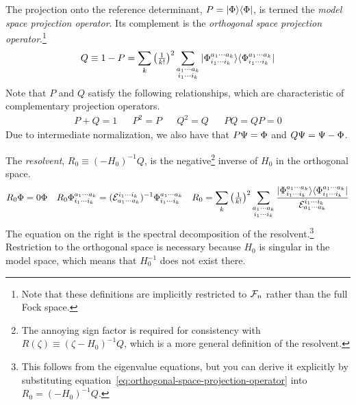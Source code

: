 \documentclass[11pt]{article}
\numberwithin{equation}{section}
\begin{document}
\begin{dfn}
The projection onto the reference determinant, $P=|\Phi \rangle\langle\Phi |$, is termed the \textit{model space projection operator}.
Its complement is the \textit{orthogonal space projection operator}.\footnote{Note that these definitions are implicitly restricted to $\mathcal{F}_n$ rather than the full Fock space.}
\begin{align}
\label{eq:orthogonal-space-projection-operator}
  Q
\equiv
  1
-
  P
=
  \sum_k
  \left(
    \tfrac{1}{k!}
  \right)^2
  \sum_{\substack{a_1\cdots a_k\\i_1\cdots i_k}}
  |\Phi _{i_1\cdots i_k}^{a_1\cdots a_k}\rangle
  \langle\Phi _{i_1\cdots i_k}^{a_1\cdots a_k}|
\end{align}
Note that $P$ and $Q$ satisfy the following relationships, which are characteristic of complementary projection operators.
\begin{align}
  P
+
  Q
=
  1
&&
  P^2
=
  P
&&
  Q^2
=
  Q
&&
  PQ
=
  QP
=
  0
\end{align}
Due to intermediate normalization, we also have that
$
  P\Psi 
=
  \Phi 
$
and
$
  Q\Psi 
=
  \Psi 
-
  \Phi 
$.
\end{dfn}

\begin{samepage}
\begin{dfn}
The \textit{resolvent},
$
  R_0
\equiv
  (-H_0)^{-1}Q
$, is the negative\footnote{The annoying sign factor is required for consistency with $R(\zeta)\equiv(\zeta-H_0)^{-1}Q$, which is a more general definition of the resolvent.} inverse of $H_0$ in the orthogonal space.
\begin{align}
\label{eq:resolvent-spectral-decomposition}
  R_0
  \Phi 
=
  0
  \Phi 
&&
  R_0
  \Phi _{i_1\cdots i_k}^{a_1\cdots a_k}
=
  (\mathcal{E}_{a_1\cdots a_k}^{i_1\cdots i_k})^{-1}
  \Phi _{i_1\cdots i_k}^{a_1\cdots a_k}
&&
  R_0
=
  \sum_k
  \left(\tfrac{1}{k!}\right)^2
  \sum_{\substack{a_1\cdots a_k\\i_1\cdots i_k}}
  \frac {
    |\Phi _{i_1\cdots i_k}^{a_1\cdots a_k}\rangle
    \langle\Phi _{i_1\cdots i_k}^{a_1\cdots a_k}|
  }{
    \mathcal{E}_{a_1\cdots a_k}^{i_1\cdots i_k}
  }
\end{align}
The equation on the right is the spectral decomposition of the resolvent.\footnote{This follows from the eigenvalue equations, but you can derive it explicitly by substituting equation~\ref{eq:orthogonal-space-projection-operator} into $R_0=(-H_0)^{-1}Q$.}
Restriction to the orthogonal space is necessary because $H_0$ is singular in the model space, which means that $H_0^{-1}$ does not exist there.
\end{dfn}
\end{samepage}
\end{document}
